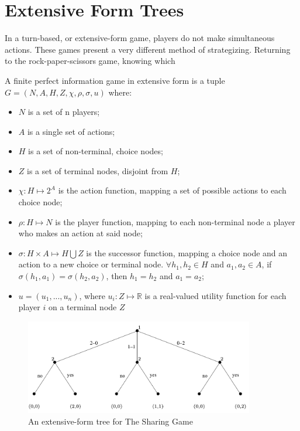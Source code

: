 \section{Extensive Form Trees}
In a turn-based, or extensive-form game, players do not make simultaneous actions. These games present a very different method of strategizing. Returning to the rock-paper-scissors game, knowing which 
\begin{define}
  A finite perfect information game in extensive form is a tuple $G = (N, A, H, Z, \chi, \rho, \sigma, u)$ where:
  \begin{itemize}
  \item $N$ is a set of n players;
  \item $A$ is a single set of actions;
  \item $H$ is a set of non-terminal, choice nodes;
  \item $Z$ is a set of terminal nodes, disjoint from $H$;
  \item $\chi: H\mapsto 2^A$ is the action function, mapping a set of possible actions to each choice node;
  \item $\rho: H\mapsto N$ is the player function, mapping to each non-terminal node a player who makes an action at said node;
  \item $\sigma: H\times A\mapsto H\bigcup Z$ is the successor function, mapping a choice node and an action to a new choice or terminal node. $\forall h_1, h_2\in H$ and $a_1, a_2\in A$, if $\sigma(h_1, a_1)=\sigma(h_2, a_2)$, then $h_1=h_2$ and $a_1=a_2$;
  \item $u=(u_1,...,u_n)$, where $u_i:Z\mapsto \mathbb{R}$ is a real-valued utility function for each player $i$ on a terminal node $Z$
  \end{itemize}
\end{define}

\begin{figure}[h]
  \centering
  \includegraphics[width=10cm]{figures/ExampleTree.png}
  \caption{An extensive-form tree for The Sharing Game}
  \label{fig:sharingTree}
\end{figure}

